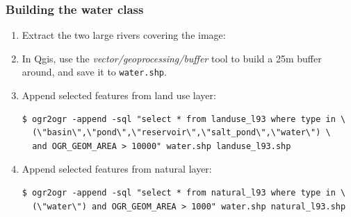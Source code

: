 \documentclass[8pt]{beamer}
\begin{document}
\begin{frame}[fragile]
\frametitle{Building the water class}
\begin{enumerate}
\item Extract the two large rivers covering the image:

\item In Qgis, use the \textit{vector/geoprocessing/buffer} tool to build a 25m buffer around, and save it to \texttt{water.shp}.

\item Append selected features from land use layer:
\begin{scriptsize}
\begin{verbatim}
$ ogr2ogr -append -sql "select * from landuse_l93 where type in \ 
  (\"basin\",\"pond\",\"reservoir\",\"salt_pond\",\"water\") \
  and OGR_GEOM_AREA > 10000" water.shp landuse_l93.shp
\end{verbatim}
\end{scriptsize}

\item Append selected features from natural layer:
\begin{scriptsize}
\begin{verbatim}
$ ogr2ogr -append -sql "select * from natural_l93 where type in \
  (\"water\") and OGR_GEOM_AREA > 1000" water.shp natural_l93.shp
\end{verbatim}
\end{scriptsize}
\end{enumerate}
\end{frame}
\end{document}
